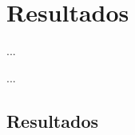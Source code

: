 \chapter{Resultados}

\begin{FraseCelebre}
\begin{Frase}
...
\end{Frase}
\begin{Fuente}
...
\end{Fuente}
\end{FraseCelebre}

\section{Resultados}
\label{cap31:sec:resultados}


